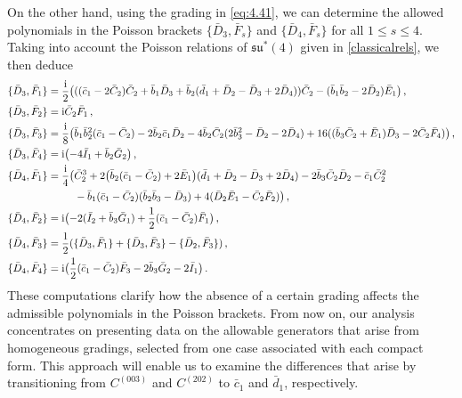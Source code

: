 \documentclass[10pt]{amsart}
\theoremstyle{definition}
\theoremstyle{corollary}
\theoremstyle{remark}
\theoremstyle{conclusion}
\begin{document}
On the other hand, using the grading in \eqref{eq:4.41}, we can determine the allowed polynomials in the Poisson brackets $\{\bar{D}_3,\bar{F}_s\}$ and $\{\bar{D}_4,\bar{F}_s\}$ for all $1 \leq s \leq 4.$ Taking into account the Poisson relations of $\mathfrak{su}^*(4)$ given in \eqref{classicalrels}, we then deduce 
\begin{align}
\{\bar{D}_3, \bar{F}_1\}&=\frac{\rm i}{2}\bigl(((\bar{c}_1-2 \bar{C}_2)\bar{C}_2+\bar{b}_1 \bar{D}_3+\bar{b}_2(\bar{d}_1+\bar{D}_2-\bar{D}_3+2\bar{D}_4)) \bar{C}_2-(\bar{b}_1\bar{b}_2-2 \bar{D}_2)\bar{E}_1\bigl) \, , \nonumber\\
\{\bar{D}_3, \bar{F}_2\}&={\rm i}\bar{C}_2 \bar{F}_1 \, ,\nonumber\\
\{\bar{D}_3, \bar{F}_3\}&=\frac{{\rm i}}{8}\bigl(\bar{b}_1 \bar{b}_2^2(\bar{c}_1-\bar{C}_2)-2\bar{b}_2\bar{c}_1\bar{D}_2-4 \bar{b}_2 \bar{C}_2(2 \bar{b}_3^2-\bar{D}_2-2\bar{D}_4)+16((\bar{b}_3\bar{C}_2+\bar{E}_1)\bar{D}_3-2\bar{C}_2\bar{F}_4)\bigl)\, , \nonumber\\
\{\bar{D}_3, \bar{F}_4\}&={\rm i}\bigl(-4 \bar{I}_1+\bar{b}_2 \bar{G}_2\bigl) \, , \nonumber \\
\{\bar{D}_4, \bar{F}_1\}&=\frac{{\rm i}}{4}\bigl( \bar{C}_2^3+2\bigl(\bar{b}_2(\bar{c}_1-\bar{C}_2)+2\bar{E}_1\bigl)(\bar{d}_1+\bar{D}_2-\bar{D}_3+2\bar{D}_4)-2\bar{b}_3\bar{C}_2\bar{D}_2-\bar{c}_1 \bar{C}_2^2 \nonumber\\
& \hskip 0.9cm-\bar{b}_1(\bar{c}_1-\bar{C}_2)(\bar{b}_2 \bar{b}_3-\bar{D}_3)+4(\bar{D}_2 \bar{E}_1-\bar{C}_2 \bar{F}_2)\bigl) \, ,\nonumber\\
\{\bar{D}_4, \bar{F}_2\}&={\rm i}\bigl(-2(\bar{I}_2+\bar{b}_3 \bar{G}_1)+\frac{1}{2}(\bar{c}_1-\bar{C}_2)\bar{F}_1\bigl) \, ,\nonumber\\
\{\bar{D}_4,\bar{F}_3\}&=\frac{1}{2}(\{\bar{D}_3,\bar{F}_1\}+\{\bar{D}_3,\bar{F}_3\}-\{\bar{D}_2,\bar{F}_3\}) \, ,\nonumber\\
\{\bar{D}_4, \bar{F}_4\}&={\rm i}\bigl(\frac{1}{2}(\bar{c}_1-\bar{C}_2)\bar{F}_3-2\bar{b}_3 \bar{G}_2-2 \bar{I}_1 \bigl)\, .
\end{align}  
\noindent  These computations clarify how the absence of a certain grading affects the admissible polynomials in the Poisson brackets. From now on, our analysis concentrates on presenting data on the allowable generators that arise from homogeneous gradings, selected from one case associated with each compact form. This approach will enable us to examine the differences that arise by transitioning from $C^{(003)}$ and $C^{(202)}$ to $\bar{c}_1$ and $\bar{d}_1$, respectively.
\end{document}
